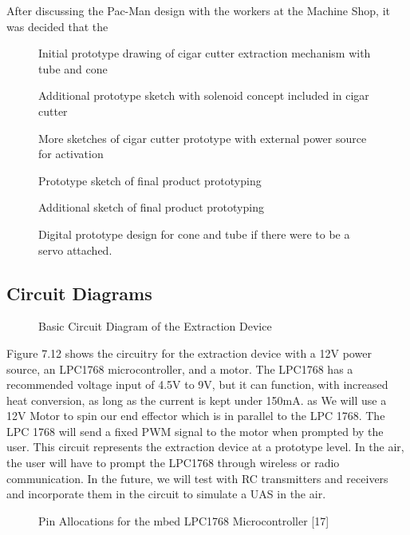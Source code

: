 \documentclass{wrcecapstone}
\begin{document}
After discussing the Pac-Man design with the workers at the Machine Shop, it was decided that the 
\begin{figure}
\caption{Initial prototype drawing of cigar cutter extraction mechanism with tube and cone}
\end{figure}
\begin{figure}
\caption{Additional prototype sketch with solenoid concept included in cigar cutter}
\end{figure}
\begin{figure}
\caption{More sketches of cigar cutter prototype with external power source for activation}
\end{figure}
\begin{figure}
\caption{Prototype sketch of final product prototyping}
\end{figure}
\begin{figure}
\caption{Additional sketch of final product prototyping}
\end{figure}
\begin{figure}
\caption{Digital prototype design for cone and tube if there were to be a servo attached.}
\end{figure}

\subsection{Circuit Diagrams}
\begin{figure}
\caption{Basic Circuit Diagram of the Extraction Device}
\end{figure}

Figure 7.12 shows the circuitry for the extraction device with a 12V power source, an LPC1768 microcontroller, and a motor. The LPC1768 has a recommended voltage input of 4.5V to 9V, but it can function, with increased heat conversion, as long as the current is kept under 150mA. as  We will use a 12V Motor to spin our end effector which is in parallel to the LPC 1768. The LPC 1768 will send a fixed PWM signal to the motor when prompted by the user.
This circuit represents the extraction device at a prototype level. In the air, the user will have to prompt the LPC1768 through wireless or radio communication. In the future, we will test with RC transmitters and receivers and incorporate them in the circuit to simulate a UAS in the air. 
\begin{figure}
\caption{Pin Allocations for the mbed LPC1768 Microcontroller [17]}
\end{figure}
\end{document}

